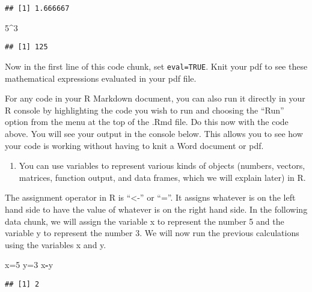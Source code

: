\documentclass[]{article}
\newenvironment{Shaded}{\begin{snugshade}}{\end{snugshade}}
\newcommand{\DecValTok}[1]{\textcolor[rgb]{0.00,0.00,0.81}{#1}}
\newcommand{\NormalTok}[1]{#1}
\newcommand{\OperatorTok}[1]{\textcolor[rgb]{0.81,0.36,0.00}{\textbf{#1}}}
\providecommand{\tightlist}{%
  \setlength{\itemsep}{0pt}\setlength{\parskip}{0pt}}
\begin{document}
\begin{verbatim}
## [1] 1.666667
\end{verbatim}

\begin{Shaded}
\begin{Highlighting}[]
\DecValTok{5}\OperatorTok{^}\DecValTok{3}
\end{Highlighting}
\end{Shaded}

\begin{verbatim}
## [1] 125
\end{verbatim}

Now in the first line of this code chunk, set \texttt{eval=TRUE}. Knit
your pdf to see these mathematical expressions evaluated in your pdf
file.

For any code in your R Markdown document, you can also run it directly
in your R console by highlighting the code you wish to run and choosing
the ``Run'' option from the menu at the top of the .Rmd file. Do this
now with the code above. You will see your output in the console below.
This allows you to see how your code is working without having to knit a
Word document or pdf.

\begin{enumerate}
\def\labelenumi{\arabic{enumi}.}
\setcounter{enumi}{1}
\tightlist
\item
  You can use variables to represent various kinds of objects (numbers,
  vectors, matrices, function output, and data frames, which we will
  explain later) in R.
\end{enumerate}

The assignment operator in R is ``\textless{}-'' or ``=''. It assigns
whatever is on the left hand side to have the value of whatever is on
the right hand side. In the following data chunk, we will assign the
variable x to represent the number 5 and the variable y to represent the
number 3. We will now run the previous calculations using the variables
x and y.

\begin{Shaded}
\begin{Highlighting}[]
\NormalTok{x=}\DecValTok{5}
\NormalTok{y=}\DecValTok{3}
\NormalTok{x}\OperatorTok{-}\NormalTok{y}
\end{Highlighting}
\end{Shaded}

\begin{verbatim}
## [1] 2
\end{verbatim}
\end{document}
